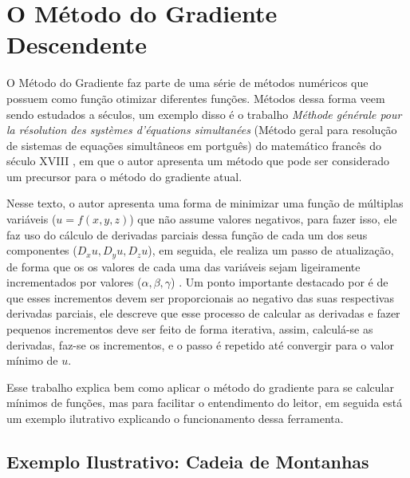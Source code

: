 

\section{O Método do Gradiente Descendente}

O Método do Gradiente faz parte de uma série de métodos numéricos que possuem como função otimizar diferentes funções. Métodos dessa forma veem sendo estudados a séculos, um exemplo disso é o trabalho \textit{M{\'e}thode g{\'e}n{\'e}rale pour la r{\'e}solution des syst{\`e}mes d'{\'e}quations simultan{\'e}es} (Método geral para resolução de sistemas de equações simultâneos em portguês) do matemático francês do século XVIII \textcite{CauchyMetodoDoGradiente}, em que o autor apresenta um método que pode ser considerado um precursor para o método do gradiente atual.

Nesse texto, o autor apresenta uma forma de minimizar uma função de múltiplas variáveis ($u=f(x,y,z)$) que não assume valores negativos, para fazer isso, ele faz uso do cálculo de derivadas parciais dessa função de cada um dos seus componentes ($D_x u, D_y u, D_z u$), em seguida, ele realiza um passo de atualização, de forma que os os valores de cada uma das variáveis sejam ligeiramente incrementados por valores ($\alpha, \beta, \gamma$) \parencite{CauchyMetodoDoGradiente}. Um ponto importante destacado por \textcite{CauchyMetodoDoGradiente} é de que esses incrementos devem ser proporcionais ao negativo das suas respectivas derivadas parciais, ele descreve que esse processo de calcular as derivadas e fazer pequenos incrementos deve ser feito de forma iterativa, assim, calculá-se as derivadas, faz-se os incrementos, e o passo é repetido até convergir para o valor mínimo de $u$.

Esse trabalho explica bem como aplicar o método do gradiente para se calcular mínimos de funções, mas para facilitar o entendimento do leitor, em seguida está um exemplo ilutrativo explicando o funcionamento dessa ferramenta.

\subsection{Exemplo Ilustrativo: Cadeia de Montanhas}

